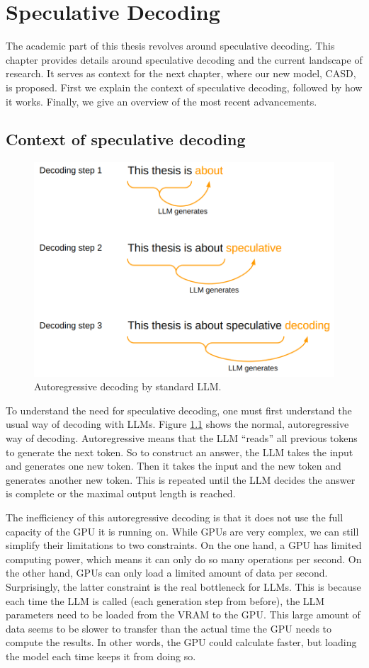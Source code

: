 
\chapter{Speculative Decoding}
\label{sec:speculative_decoding}

The academic part of this thesis revolves around speculative decoding. This chapter provides details around speculative decoding and the current landscape of research. It serves as context for the next chapter, where our new model, CASD, is proposed. First we explain the context of speculative decoding, followed by how it works. Finally, we give an overview of the most recent advancements. 

\section{Context of speculative decoding}

\begin{figure}[h]
	\centering
	\includegraphics[width=0.7\linewidth]{fig/spec_dec_autoregressive.png}
	\caption{Autoregressive decoding by standard LLM.}
	\label{fig:spec_dec_autoregressive}
\end{figure}

To understand the need for speculative decoding, one must first understand the usual way of decoding with LLMs. Figure \ref{fig:spec_dec_autoregressive} shows the normal, autoregressive way of decoding. Autoregressive means that the LLM ``reads'' all previous tokens to generate the next token. So to construct an answer, the LLM takes the input and generates one new token. Then it takes the input and the new token and generates another new token. This is repeated until the LLM decides the answer is complete or the maximal output length is reached.

The inefficiency of this autoregressive decoding is that it does not use the full capacity of the GPU it is running on. While GPUs are very complex, we can still simplify their limitations to two constraints. On the one hand, a GPU has limited computing power, which means it can only do so many operations per second. On the other hand, GPUs can only load a limited amount of data per second. Surprisingly, the latter constraint is the real bottleneck for LLMs. This is because each time the LLM is called (each generation step from before), the LLM parameters need to be loaded from the VRAM to the GPU. This large amount of data seems to be slower to transfer than the actual time the GPU needs to compute the results. In other words, the GPU could calculate faster, but loading the model each time keeps it from doing so.

